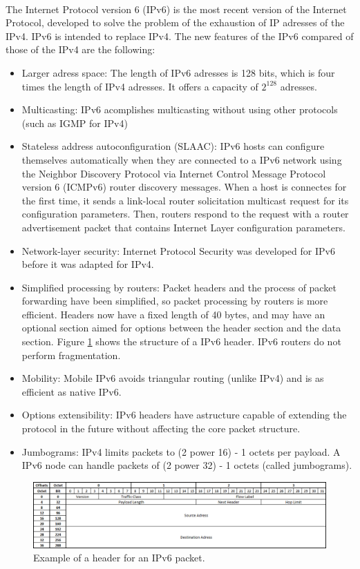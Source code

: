 \paragraph{}The Internet Protocol version 6 (IPv6) is the most recent version of the Internet Protocol, developed to solve the problem of the exhaustion of IP adresses of the IPv4. IPv6 is intended to replace IPv4. The new features of the IPv6 compared of those of the IPv4 are the following:
\begin{itemize}
	\item Larger adress space: The length of IPv6 adresses is 128 bits, which is four times the length of IPv4 adresses. It offers a capacity of $2^{128}$ adresses.
	\item Multicasting: IPv6 acomplishes multicasting without using other protocols (such as IGMP for IPv4)
	\item Stateless address autoconfiguration (SLAAC): IPv6 hosts can configure themselves automatically when they are connected to a IPv6 network using the Neighbor Discovery Protocol via Internet Control Message Protocol version 6 (ICMPv6) router discovery messages. When a host is connectes for the first time, it sends a link-local router solicitation multicast request for its configuration parameters. Then, routers respond to the request with a router advertisement packet that contains Internet Layer configuration parameters.
	\item Network-layer security: Internet Protocol Security was developed for IPv6 before it was adapted for IPv4.
	\item Simplified processing by routers: Packet headers and the process of packet forwarding have been simplified, so packet processing by routers is more efficient. Headers now have a fixed length of 40 bytes, and may have an optional section aimed for options between the header section and the data section. Figure \ref{fig:IPv6header} shows the structure of a IPv6 header. IPv6 routers do not perform fragmentation.
	\item Mobility: Mobile IPv6 avoids triangular routing (unlike IPv4) and is as efficient as native IPv6.
	\item Options extensibility: IPv6 headers have astructure capable of extending the protocol in the future without affecting the core packet structure.
	\item Jumbograms: IPv4 limits packets to (2 power 16) - 1 octets per payload. A IPv6 node can handle packets of (2 power 32) - 1 octets (called jumbograms).
\end{itemize}
\begin{figure}[H]
\begin{center}
\includegraphics[scale=0.6]{IPv6_header.PNG}
\caption[IPv6 header]{Example of a header for an IPv6 packet.}
\label{fig:IPv6header}
\end{center}
\end{figure}

